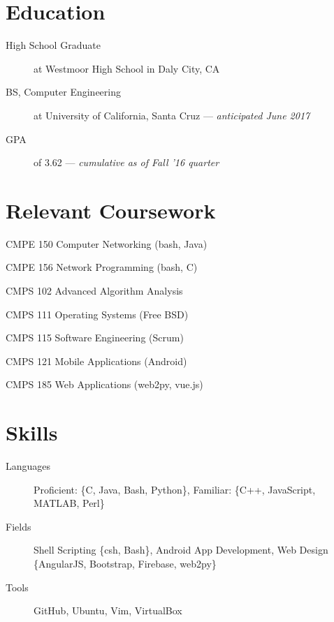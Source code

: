 \documentclass[11pt]{article}
\author{August Valera}
\begin{document}

\section*{Education}
\begin{description}
  \item[High School Graduate] at Westmoor High School in Daly City, CA
  \item[BS, Computer Engineering] at University of California,
    Santa Cruz --- \textit{anticipated June 2017}
  \item[GPA] of 3.62 --- \textit{cumulative as of Fall '16 quarter}
\end{description}

\section*{Relevant Coursework}
\begin{description}
    \begin{multicols}{2}
    \item[CMPE 150] Computer Networking (bash, Java)
    \item[CMPE 156] Network Programming (bash, C)
    \item[CMPS 102] Advanced Algorithm Analysis
    \item[CMPS 111] Operating Systems (Free BSD)
    \item[CMPS 115] Software Engineering (Scrum)
    \item[CMPS 121] Mobile Applications (Android)
    \item[CMPS 185] Web Applications (web2py, vue.js)
    \end{multicols}
\end{description}

\section*{Skills}
\begin{description}
  \item[Languages] Proficient: \{C, Java, Bash, Python\},
    Familiar: \{C++, JavaScript, MATLAB, Perl\}
  \item[Fields] Shell Scripting \{csh, Bash\}, Android App Development, Web
    Design \{AngularJS, Bootstrap, Firebase, web2py\}
  \item[Tools] GitHub, Ubuntu, Vim, VirtualBox
\end{description}
\end{document}
